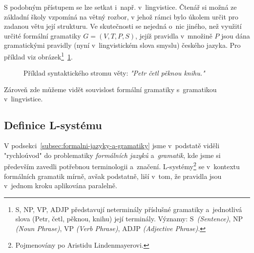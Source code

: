 S podobným přístupem se lze setkat i~např. v~lingvistice. Čtenář si možná ze základní školy vzpomíná na větný rozbor, v jehož rámci bylo úkolem určit pro zadanou větu její strukturu. Ve skutečnosti se nejedná o~nic jiného, než využití určité formální gramatiky $G=(V,T,P,S)$, jejíž pravidla v~množině $P$ jsou dána gramatickými pravidly (nyní v~lingvistickém slova smyslu) českého jazyka. Pro příklad viz obrázek\footnote{S, NP, VP, ADJP představují neterminály příslušné gramatiky a~jednotlivá slova (Petr, četl, pěknou, knihu) její terminály. Významy: S~\emph{(Sentence)}, NP \emph{(Noun Phrase)}, VP \emph{(Verb Phrase)}, ADJP \emph{(Adjective Phrase)}.}~\ref{fig:syntax-strom-vety}.
\begin{figure}[h]
    \centering
    \caption{Příklad syntaktického stromu věty: \emph{"Petr četl pěknou knihu."}}
    \label{fig:syntax-strom-vety}
\end{figure}
Zároveň zde můžeme vidět souvislost formální gramatiky s~gramatikou v~lingvistice.

\subsection{Definice L-systému}\label{subsec:definice-lsystemu}

V podsekci~\ref{subsec:formalni-jazyky-a-gramatiky} jsme v~podstatě viděli "rychloúvod" do problematiky \emph{formálních jazyků} a~\emph{gramatik}, kde jsme si především zavedli potřebnou terminologii a~značení. L-systémy\footnote{Pojmenovány po Aristidu Lindenmayerovi.} se v~kontextu formálních gramatik mírně, avšak podstatně, liší v~tom, že pravidla jsou v~jednom kroku aplikována paralelně.

